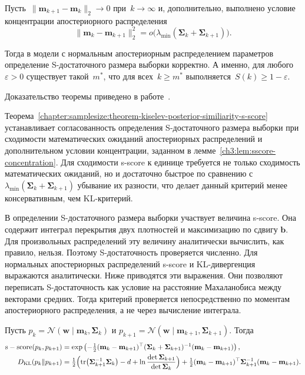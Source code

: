 \begin{theorem}\label{chapter:samplesize:theorem-kiselev-posterior-similiarity-s-score}
    Пусть~$\|\mathbf{m}_{k+1} - \mathbf{m}_k\|_2\to 0$ при~$k \to \infty$ и, дополнительно, выполнено условие концентрации апостериорного распределения
    \[
        \|\mathbf{m}_k-\mathbf{m}_{k+1}\|_2^2=o\bigl(\lambda_{\min}(\mathbf{\Sigma}_k+\mathbf{\Sigma}_{k+1})\bigr).
    \]

    Тогда в модели с нормальным апостериорным распределением параметров определение S-достаточного размера выборки корректно.
    А именно, для любого~$\varepsilon > 0$ существует такой~$m^*$, что для всех~$k\geqslant m^*$ выполняется~$S(k)\geqslant 1-\varepsilon$.
\end{theorem}
Доказательство теоремы приведено в работе~\cite{grabovoi2025sample727559461}.

Теорема~\ref{chapter:samplesize:theorem-kiselev-posterior-similiarity-s-score} устанавливает согласованность определения S-достаточного размера выборки при сходимости математических ожиданий апостериорных распределений и дополнительном условии концентрации, заданном в лемме~\ref{ch3:lem:sscore-concentration}. Для сходимости s-score к единице требуется не только сходимость математических ожиданий, но и достаточно быстрое по сравнению с $\lambda_{\min}(\mathbf{\Sigma}_k+\mathbf{\Sigma}_{k+1})$ убывание их разности, что делает данный критерий менее консервативным, чем KL-критерий.

В определении S-достаточного размера выборки участвует величина s-score.
Она содержит интеграл перекрытия двух плотностей и максимизацию по сдвигу $\mathbf{b}$.
Для произвольных распределений эту величину аналитически вычислить, как правило, нельзя.
Поэтому S-достаточность проверяется численно.
Для нормальных апостериорных распределений s-score и KL-дивергенция выражаются аналитически.
Ниже приводятся эти выражения.
Они позволяют переписать S-достаточность как условие на расстояние Махаланобиса между векторами средних.
Тогда критерий проверяется непосредственно по моментам апостериорного распределения, а не через вычисление интеграла.

\begin{proposition}\label{ch3:prop:normal-closed}
Пусть $p_k=\mathcal{N}(\mathbf{w}\mid\mathbf{m}_k,\mathbf{\Sigma}_k)$ и $p_{k+1}=\mathcal{N}(\mathbf{w}\mid\mathbf{m}_{k+1},\mathbf{\Sigma}_{k+1})$. Тогда
\begin{align}
  \mathrm{s-score}(p_k,p_{k+1})
  &=\exp\left(-\tfrac12(\mathbf{m}_k-\mathbf{m}_{k+1})^{\top}
      (\mathbf{\Sigma}_k+\mathbf{\Sigma}_{k+1})^{-1}(\mathbf{m}_k-\mathbf{m}_{k+1})\right), \label{ch3:eq:sscore}\\
  D_{\mathrm{KL}}(p_k\|p_{k+1})
  &=\tfrac12\Bigl(\operatorname{tr}\bigl(\mathbf{\Sigma}_{k+1}^{-1}\mathbf{\Sigma}_k\bigr)-d
      +\ln\frac{\det\mathbf{\Sigma}_{k+1}}{\det\mathbf{\Sigma}_k}\Bigr)
      +\tfrac12(\mathbf{m}_k-\mathbf{m}_{k+1})^{\top}\mathbf{\Sigma}_{k+1}^{-1}(\mathbf{m}_k-\mathbf{m}_{k+1}). \label{ch3:eq:kl}
\end{align}
\end{proposition}

